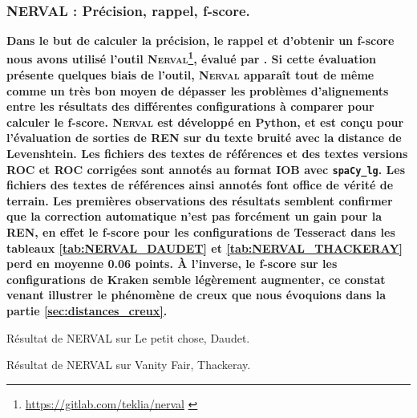 \subsubsection{\textsc{NERVAL} : Précision, rappel, f-score.}
\label{subsec:NERVAL_COR-OCR-IMPACT-NER}
\textbf{Dans le but de calculer la précision, le rappel et d'obtenir un f-score nous avons utilisé l'outil \textsc{Nerval}\footnote{\url{https://gitlab.com/teklia/nerval} \cite{nerval2021}}, évalué par \cite{koudoro2022reconnaissance}. Si cette évaluation présente quelques biais de l'outil, \textsc{Nerval} apparaît tout de même comme un très bon moyen de dépasser les problèmes d'alignements entre les résultats des différentes configurations à comparer pour calculer le f-score. \textsc{Nerval} est développé en Python, et est conçu pour l'évaluation de sorties de REN sur du texte bruité avec la distance de Levenshtein. Les fichiers des textes de références et des textes versions ROC et ROC corrigées sont annotés au format IOB avec \texttt{spaCy\_lg}. Les fichiers des textes de références ainsi annotés font office de vérité de terrain.
Les premières observations des résultats semblent confirmer que la correction automatique n'est pas forcément un gain pour la REN, en effet le f-score pour les configurations de Tesseract dans les tableaux \ref{tab:NERVAL_DAUDET} et \ref{tab:NERVAL_THACKERAY} perd en moyenne 0.06 points. À l'inverse, le f-score sur les configurations de Kraken semble légèrement augmenter, ce constat venant illustrer le phénomène de creux que nous évoquions dans la partie \ref{sec:distances_creux}.}

\begin{table}[h!]
     \centering

     \caption{Résultat de \textsc{NERVAL} sur {\normalfont Le petit chose}, Daudet.}
     \label{tab:NERVAL_DAUDET}
 \end{table}

   \begin{table}[h!]
     \centering

     \caption{Résultat de \textsc{NERVAL} sur {\normalfont Vanity Fair}, Thackeray.}
     \label{tab:NERVAL_THACKERAY}
 \end{table}

